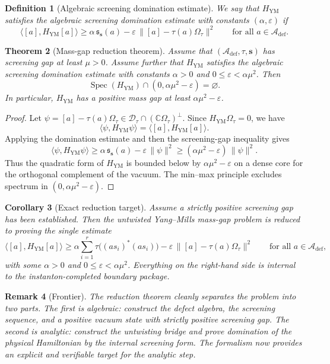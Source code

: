 \documentclass[11pt]{article}
\theoremstyle{plainstyle}
\newtheorem{theorem}{Theorem}[section]
\newtheorem{corollary}[theorem]{Corollary}
\theoremstyle{defstyle}
\newtheorem{definition}[theorem]{Definition}
\newtheorem{remark}[theorem]{Remark}
\newcommand{\A}{\mathcal{A}}
\newcommand{\C}{\mathbb{C}}
\newcommand{\Dtau}{\mathcal{D}_{\tau}}
\newcommand{\Omegatau}{\Omega_{\tau}}
\begin{document}
\begin{definition}[Algebraic screening domination estimate]
We say that $H_{\mathrm{YM}}$ satisfies the \emph{algebraic screening domination estimate}
with constants $(\alpha,\varepsilon)$ if
\[
\bigl\langle [a],H_{\mathrm{YM}}[a]\bigr\rangle
\ge
\alpha\,\mathfrak s_{\mathbf s}(a)
-\varepsilon\,\bigl\|[a]-\tau(a)\Omegatau\bigr\|^2
\qquad\text{for all }a\in \A_{\mathrm{def}}.
\]
\end{definition}

\begin{theorem}[Mass-gap reduction theorem]
Assume that $(\A_{\mathrm{def}},\tau,\mathbf s)$ has screening gap at least $\mu>0$.
Assume further that $H_{\mathrm{YM}}$ satisfies the algebraic screening domination estimate
with constants $\alpha>0$ and $0\le \varepsilon<\alpha\mu^2$.
Then
\[
\operatorname{Spec}(H_{\mathrm{YM}})\cap (0,\alpha\mu^2-\varepsilon)=\varnothing.
\]
In particular, $H_{\mathrm{YM}}$ has a positive mass gap at least $\alpha\mu^2-\varepsilon$.
\end{theorem}

\begin{proof}
Let $\psi=[a]-\tau(a)\Omegatau\in \Dtau\cap (\C\Omegatau)^{\perp}$.
Since $H_{\mathrm{YM}}\Omegatau=0$, we have
\[
\langle \psi,H_{\mathrm{YM}}\psi\rangle
=
\langle [a],H_{\mathrm{YM}}[a]\rangle.
\]
Applying the domination estimate and then the screening-gap inequality gives
\[
\langle \psi,H_{\mathrm{YM}}\psi\rangle
\ge
\alpha\,\mathfrak s_{\mathbf s}(a)-\varepsilon\,\|\psi\|^2
\ge
(\alpha\mu^2-\varepsilon)\,\|\psi\|^2.
\]
Thus the quadratic form of $H_{\mathrm{YM}}$ is bounded below by $\alpha\mu^2-\varepsilon$ on a dense core for the orthogonal complement of the vacuum.
The min--max principle excludes spectrum in $(0,\alpha\mu^2-\varepsilon)$.
\end{proof}

\begin{corollary}[Exact reduction target]
Assume a strictly positive screening gap has been established.
Then the untwisted Yang--Mills mass-gap problem is reduced to proving the single estimate
\[
\bigl\langle [a],H_{\mathrm{YM}}[a]\bigr\rangle
\ge
\alpha\sum_{i=1}^r \tau\bigl((a s_i)^*(a s_i)\bigr)
-\varepsilon\,\bigl\|[a]-\tau(a)\Omegatau\bigr\|^2
\qquad\text{for all }a\in \A_{\mathrm{def}},
\]
with some $\alpha>0$ and $0\le \varepsilon<\alpha\mu^2$.
Everything on the right-hand side is internal to the instanton-completed boundary package.
\end{corollary}

\begin{remark}[Frontier]
The reduction theorem cleanly separates the problem into two parts.
The first is algebraic: construct the defect algebra, the screening sequence, and a positive vacuum state with strictly positive screening gap.
The second is analytic: construct the untwisting bridge and prove domination of the physical Hamiltonian by the internal screening form.
The formalism now provides an explicit and verifiable target for the analytic step.
\end{remark}
\end{document}

